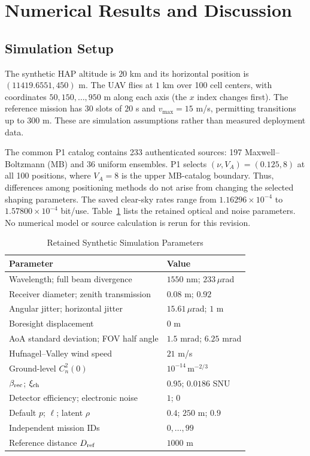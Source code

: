 \section{Numerical Results and Discussion}
\label{sec:numerical}
\subsection{Simulation Setup}
The synthetic HAP altitude is $20$ km and its horizontal position is
$(11419.6551,450)$ m. The UAV flies at $1$ km over 100 cell centers,
with coordinates $50,150,\ldots,950$ m along each axis (the $x$ index
changes first). The reference mission has $30$ slots of $20$ s and
$v_{\max}=15$ m/s, permitting transitions up to $300$ m.
These are simulation assumptions rather than measured deployment data.

The common P1 catalog contains 233 authenticated sources: 197
Maxwell--Boltzmann (MB) and 36 uniform ensembles. P1 selects
$(\nu,V_A)=(0.125,8)$ at all 100 positions, where $V_A=8$ is the upper
MB-catalog boundary. Thus, differences among positioning methods do
not arise from changing the selected shaping parameters. The saved
clear-sky rates range from $1.16296\times10^{-4}$ to
$1.57800\times10^{-4}$ bit/use. Table~\ref{tab:setup} lists the
retained optical and noise parameters. No numerical model or source
calculation is rerun for this revision.

\begin{table}[t]
\caption{Retained Synthetic Simulation Parameters}
\label{tab:setup}
\centering\footnotesize
\begin{tabular}{@{}p{}p{}@{}}
\toprule
Parameter & Value\\\midrule
Wavelength; full beam divergence & $1550$ nm; $233\,\mu$rad\\
Receiver diameter; zenith transmission & $0.08$ m; $0.92$\\
Angular jitter; horizontal jitter & $15.61\,\mu$rad; $1$ m\\
Boresight displacement & $0$ m\\
AoA standard deviation; FOV half angle & $1.5$ mrad; $6.25$ mrad\\
Hufnagel--Valley wind speed & $21$ m/s\\
Ground-level $C_n^2(0)$ & $10^{-14}\,\mathrm{m}^{-2/3}$\\
$\beta_{\rm rec}$; $\xi_{\rm ch}$ & $0.95$; $0.0186$ SNU\\
Detector efficiency; electronic noise & $1$; $0$\\
Default $p$; $\ell$; latent $\rho$ & $0.4$; $250$ m; $0.9$\\
Independent mission IDs & $0,\ldots,99$\\
Reference distance $D_{\rm ref}$ & $1000$ m\\\bottomrule
\end{tabular}
\end{table}

